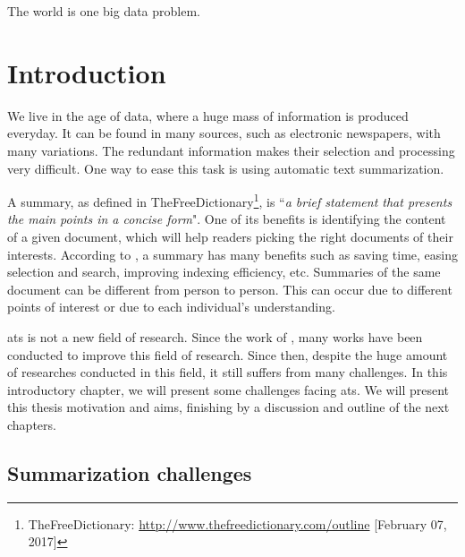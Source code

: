 \begin{savequote}[75mm] 
The world is one big data problem.
\end{savequote}

\chapter{Introduction}

We
live in the age of data, where a huge mass of information is produced everyday. 
It can be found in many sources, such as electronic newspapers, with many variations.
The redundant information makes their selection and processing very difficult.
One way to ease this task is using automatic text summarization. 

A summary, as defined in TheFreeDictionary\footnote{TheFreeDictionary: \url{http://www.thefreedictionary.com/outline} [February 07, 2017]}, is ``\textit{a brief statement that presents the main points in a concise form}".
One of its benefits is identifying the content of a given document, which will help readers picking the right documents of their interests.
According to \citet{75-borko-bernier}, a summary has many benefits such as saving time, easing selection and search, improving indexing efficiency, etc. 
Summaries of the same document can be different from person to person. 
This can occur due to different points of interest or due to each individual's understanding.

\ac{ats} is not a new field of research. 
Since the work of \citet{58-luhn}, many works have been conducted to improve this field of research. 
Since then, despite the huge amount of researches conducted in this field, it still suffers from many challenges. 
In this introductory chapter, we will present some challenges facing \ac{ats}.
We will present this thesis motivation and aims, finishing by a discussion and outline of the next chapters.



\section{Summarization challenges}

